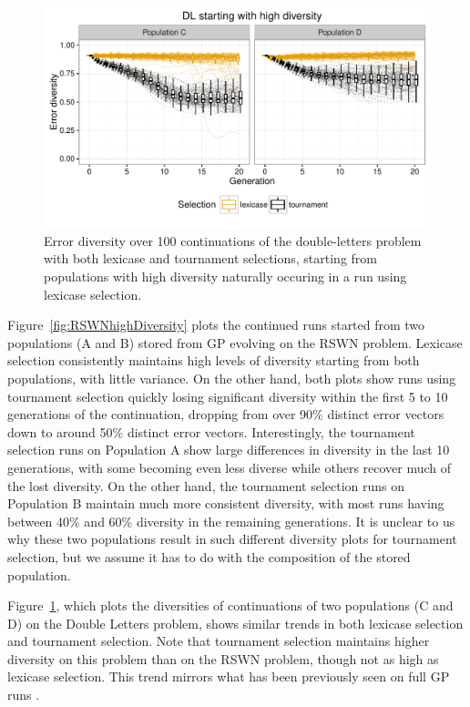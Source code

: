 \documentclass{sig-alternate-05-2015}
\begin{document}
\begin{figure}
	\includegraphics{../figures/DL_high_diversity}
	\vspace{-1 cm}
	\caption{Error diversity over 100 continuations of the double-letters problem with both lexicase and tournament selections, starting from populations with high diversity naturally occuring in a run using lexicase selection.}
	\label{fig:DLhighDiversity}
\end{figure}

Figure~\ref{fig:RSWNhighDiversity} plots the continued runs started from two populations (A and B) stored from GP evolving on the RSWN problem. Lexicase selection consistently maintains high levels of diversity starting from both populations, with little variance. On the other hand, both plots show runs using tournament selection quickly losing significant diversity within the first 5 to 10 generations of the continuation, dropping from over 90\% distinct error vectors down to around 50\% distinct error vectors. Interestingly, the tournament selection runs on Population A show large differences in diversity in the last 10 generations, with some becoming even less diverse while others recover much of the lost diversity. On the other hand, the tournament selection runs on Population B maintain much more consistent diversity, with most runs having between 40\% and 60\% diversity in the remaining generations. It is unclear to us why these two populations result in such different diversity plots for tournament selection, but we assume it has to do with the composition of the stored population.

Figure~\ref{fig:DLhighDiversity}, which plots the diversities of continuations of two populations (C and D) on the Double Letters problem, shows similar trends in both lexicase selection and tournament selection. Note that tournament selection maintains higher diversity on this problem than on the RSWN problem, though not as high as lexicase selection. This trend mirrors what has been previously seen on full GP runs \cite{Helmuth:2015:GPTP}.
\end{document}
